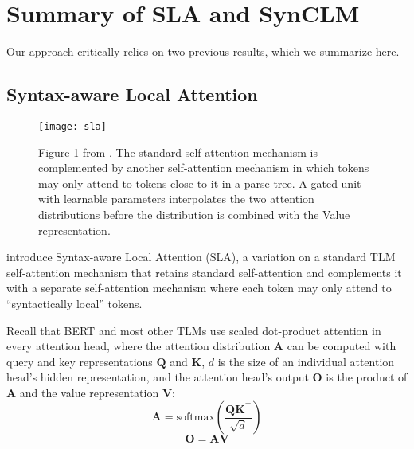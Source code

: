 \documentclass[11pt]{article}
\begin{document}



\clearpage
\appendix

\section{Summary of SLA and SynCLM}
\label{sec:methods}
Our approach critically relies on two previous results, which we summarize here.

\subsection{Syntax-aware Local Attention}\label{sec:sla}
\begin{figure}
    \centering
    \texttt{[image: sla]}
    \caption{Figure 1 from \citet{li-etal-2021-improving-bert}. The standard self-attention mechanism is complemented by another self-attention mechanism in which tokens may only attend to tokens close to it in a parse tree. A gated unit with learnable parameters interpolates the two attention distributions before the distribution is combined with the Value representation.}
    \label{fig:sla}
\end{figure}

\citet{li-etal-2021-improving-bert} introduce Syntax-aware Local Attention (SLA), a variation on a standard TLM self-attention mechanism that retains standard self-attention and complements it with a separate self-attention mechanism where each token may only attend to ``syntactically local'' tokens.

Recall that BERT and most other TLMs use scaled dot-product attention in every attention head, where the attention distribution $\mathbf{A}$ can be computed with query and key representations $\mathbf{Q}$ and $\mathbf{K}$, $d$ is the size of an individual attention head's hidden representation, and the attention head's output $\mathbf{O}$ is the product of $\mathbf{A}$ and the value representation $\mathbf{V}$:
\begin{equation}\label{eq:attention}
    \mathbf{A} = \mathrm{softmax}\left(\frac{\mathbf{QK}^\top}{\sqrt{d}}\right)
\end{equation}
\begin{equation}
    \mathbf{O} = \mathbf{A}\mathbf{V}
\end{equation}
\end{document}
